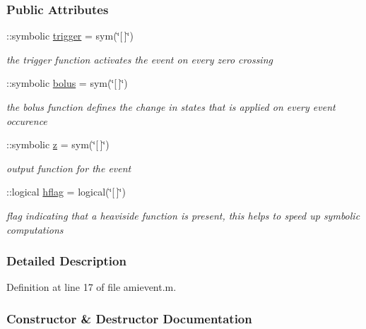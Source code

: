 \subsubsection*{Public Attributes}
\begin{DoxyCompactItemize}
\item 
\+::symbolic \hyperlink{classamievent_ae194cb817eae4085f8023885100c68dd}{trigger} = sym(\char`\"{}\mbox{[}$\,$\mbox{]}\char`\"{})
\begin{DoxyCompactList}\small\item\em the trigger function activates the event on every zero crossing \end{DoxyCompactList}\item 
\+::symbolic \hyperlink{classamievent_ab9227561ac246ee4b70f9e65c25ffda7}{bolus} = sym(\char`\"{}\mbox{[}$\,$\mbox{]}\char`\"{})
\begin{DoxyCompactList}\small\item\em the bolus function defines the change in states that is applied on every event occurence \end{DoxyCompactList}\item 
\+::symbolic \hyperlink{classamievent_a25ed1bcb423b0b7200f485fc5ff71c8e}{z} = sym(\char`\"{}\mbox{[}$\,$\mbox{]}\char`\"{})
\begin{DoxyCompactList}\small\item\em output function for the event \end{DoxyCompactList}\item 
\+::logical \hyperlink{classamievent_ab98347b5ce6fbe7bd007030346b88575}{hflag} = logical(\char`\"{}\mbox{[}$\,$\mbox{]}\char`\"{})
\begin{DoxyCompactList}\small\item\em flag indicating that a heaviside function is present, this helps to speed up symbolic computations \end{DoxyCompactList}\end{DoxyCompactItemize}


\subsubsection{Detailed Description}


Definition at line 17 of file amievent.\+m.



\subsubsection{Constructor \& Destructor Documentation}
\hypertarget{classamievent_aa89b0efd53c33a18acf04c1dda76842c}{}
